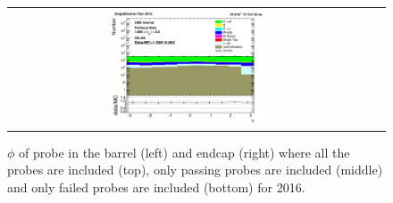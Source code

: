 \begin{figure}[htp]
\begin{center}
\begin{tabular}{cc}
      \includegraphics[width=0.45\textwidth]{figures/Zprime/2016/ScaleFactor/SameSign/nominal/stack_phi_Endcap_fail_PUW.png}
    \end{tabular}
    \caption{$\phi$ of probe in the barrel (left) and endcap (right) where all the probes are included (top), only passing probes are included (middle) and only failed probes are included (bottom) for 2016.}
    \label{fig:SS_nominal_phi_2016}
  \end{center}
\end{figure}
